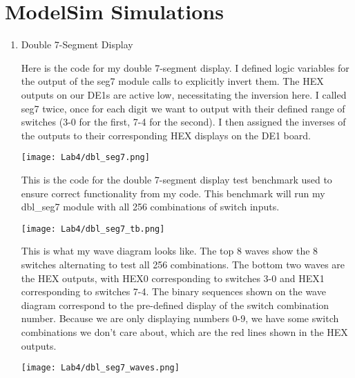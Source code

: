 \documentclass{article}
\newenvironment{solution}{\begin{mdframed}[style=SolutionFrame]}{\end{mdframed}}
\newenvironment{enum}{\begin{enumerate}[label={(\alph*)}]}{\end{enumerate}}
\begin{document}
\section{ModelSim Simulations}
    \begin{enum}
        \item Double 7-Segment Display
            \begin{solution}
                Here is the code for my double 7-segment display. I defined logic variables for the output of the seg7 module calls to explicitly invert them. The HEX outputs on our DE1s are active low, necessitating the inversion here. I called seg7 twice, once for each digit we want to output with their defined range of switches (3-0 for the first, 7-4 for the second). I then assigned the inverses of the outputs to their corresponding HEX displays on the DE1 board. \\
                \begin{minipage}[t]{0.9\linewidth}
                    \begin{center}
                        \texttt{[image: Lab4/dbl\_seg7.png]}
                    \end{center}
                \end{minipage}
                
                \newpage
                This is the code for the double 7-segment display test benchmark used to ensure correct functionality from my code. This benchmark will run my dbl\_seg7 module with all 256 combinations of switch inputs. \\
                \begin{minipage}[t]{0.9\linewidth}
                    \begin{center}
                        \texttt{[image: Lab4/dbl\_seg7\_tb.png]}
                    \end{center}
                \end{minipage}
                
                \clearpage
                This is what my wave diagram looks like. The top 8 waves show the 8 switches alternating to test all 256 combinations. The bottom two waves are the HEX outputs, with HEX0 corresponding to switches 3-0 and HEX1 corresponding to switches 7-4. The binary sequences shown on the wave diagram correspond to the pre-defined display of the switch combination number. Because we are only displaying numbers 0-9, we have some switch combinations we don't care about, which are the red lines shown in the HEX outputs. \\
                \begin{minipage}[t]{0.9\linewidth}
                    \begin{center}
                        \texttt{[image: Lab4/dbl\_seg7\_waves.png]}
                    \end{center}
                \end{minipage}
            \end{solution}


\end{enum}
\end{document}
